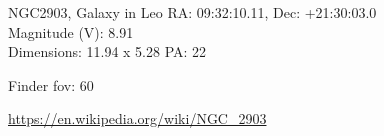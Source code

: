\begin{block}{NGC2903, Galaxy in Leo}
    RA: 09:32:10.11, Dec: +21:30:03.0 \\ 
    Magnitude (V): 8.91 \\ 
    Dimensions: 11.94 x 5.28 PA: 22 

    Finder fov: 60 

    \url{https://en.wikipedia.org/wiki/NGC_2903} 
\end{block}